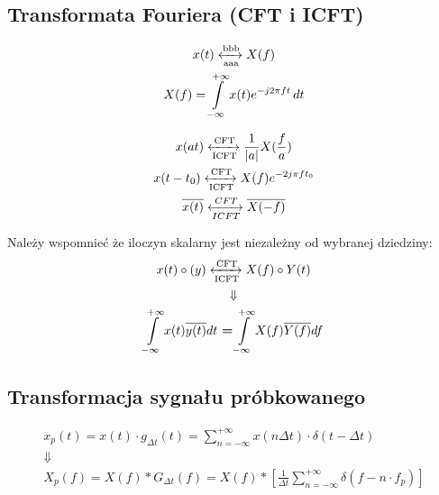     \subsection{Transformata Fouriera (CFT i ICFT)}
        \begin{multicols}{2}
            \begin{gather*}
                x(t) \xleftrightarrow[\text{aaa}]{\text{bbb}} X(f)\\
                X(f) = \int\limits_{-\infty}^{+\infty} x(t) e^{-j2\pi f t}  \,dt 
            \end{gather*}

            \begin{gather*}
                x(a t)\xleftrightarrow[\text{ICFT}]{\text{CFT}} \frac{1}{|a|} X(\frac{f}{a})\\
                x(t - t_0)\xleftrightarrow[\text{ICFT}]{\text{CFT}} X(f)e^{-2j\pi ft_0}\\
                \overline{x(t)} \xleftrightarrow[ICFT]{CFT} \overline{X(-f)}
            \end{gather*}
        \end{multicols}
        Należy wspomnieć że iloczyn skalarny jest niezależny od wybranej dziedziny:
        \begin{gather*}
            x(t)\circ(y) \xleftrightarrow[\text{ICFT}]{\text{CFT}} X(f) \circ Y(t)\\
            \Downarrow\\
            \int\limits^{+\infty}_{-\infty}x(t)\overline{y(t)} dt \ \textbf{=} \int\limits^{+\infty}_{-\infty}X(f)\overline{Y(f)}df
        \end{gather*}

    \subsection{Transformacja sygnału próbkowanego}
        \begin{gather*}
            x_p(t) = x(t)\cdot g_{\Delta t}(t) = \sum_{n=-\infty}^{+\infty}x(n\Delta t)\cdot\delta(t-\Delta t)\\
            \Downarrow\\
            X_p(f) = X(f) * G_{\Delta t}(f) = X(f) * \left[\frac{1}{\Delta t} \sum_{n=-\infty}^{+\infty}\delta(f-n\cdot f_p)\right]
        \end{gather*}

